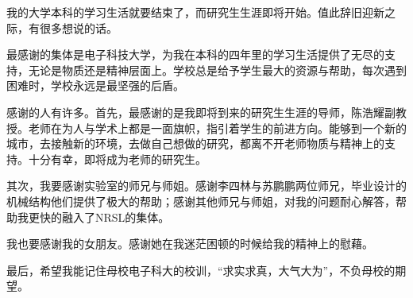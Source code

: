 
我的大学本科的学习生活就要结束了，而研究生生涯即将开始。值此辞旧迎新之际，有很多想说的话。

最感谢的集体是电子科技大学，为我在本科的四年里的学习生活提供了无尽的支持，无论是物质还是精神层面上。学校总是给予学生最大的资源与帮助，每次遇到困难时，学校永远是最坚强的后盾。

感谢的人有许多。首先，最感谢的是我即将到来的研究生生涯的导师，陈浩耀副教授。老师在为人与学术上都是一面旗帜，指引着学生的前进方向。能够到一个新的城市，去接触新的环境，去做自己想做的研究，都离不开老师物质与精神上的支持。十分有幸，即将成为老师的研究生。

其次，我要感谢实验室的师兄与师姐。感谢李四林与苏鹏鹏两位师兄，毕业设计的机械结构他们提供了极大的帮助；感谢其他师兄与师姐，对我的问题耐心解答，帮助我更快的融入了NRSL的集体。

我也要感谢我的女朋友。感谢她在我迷茫困顿的时候给我的精神上的慰藉。

最后，希望我能记住母校电子科大的校训，“求实求真，大气大为”，不负母校的期望。